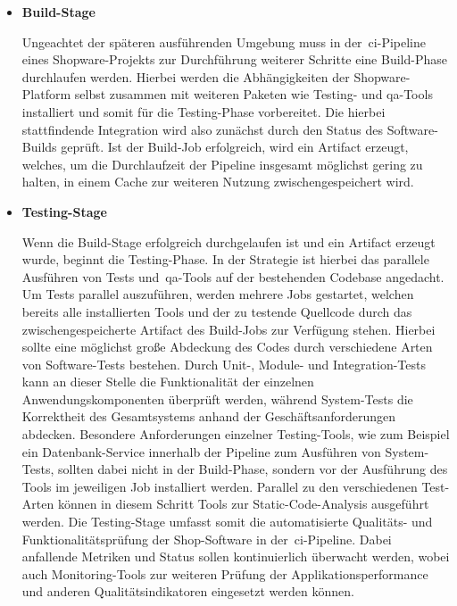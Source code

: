 \begin{itemize}
    \item {
        \textbf{Build-Stage}\par
        Ungeachtet der späteren ausführenden Umgebung muss in der\ \acrshort{ci}-Pipeline eines Shopware-Projekts zur
        Durchführung weiterer Schritte eine Build-Phase durchlaufen werden.
        Hierbei werden die Abhängigkeiten der Shopware-Platform selbst zusammen mit weiteren Paketen wie Testing- und
        \acrshort{qa}-Tools installiert und somit für die Testing-Phase vorbereitet.
        Die hierbei stattfindende Integration wird also zunächst durch den Status des Software-Builds geprüft.
        Ist der Build-Job erfolgreich, wird ein Artifact erzeugt, welches, um die Durchlaufzeit der Pipeline insgesamt
        möglichst gering zu halten, in einem Cache zur weiteren Nutzung zwischengespeichert wird.
    }

    \item {
        \textbf{Testing-Stage}\par
        Wenn die Build-Stage erfolgreich durchgelaufen ist und ein Artifact erzeugt wurde, beginnt die Testing-Phase.
        In der Strategie ist hierbei das parallele Ausführen von Tests und\ \acrshort{qa}-Tools auf der bestehenden
        Codebase angedacht.
        Um Tests parallel auszuführen, werden mehrere Jobs gestartet, welchen bereits alle installierten Tools
        und der zu testende Quellcode durch das zwischengespeicherte Artifact des Build-Jobs zur Verfügung stehen.
        Hierbei sollte eine möglichst große Abdeckung des Codes durch verschiedene Arten von Software-Tests bestehen.
        Durch Unit-, Module- und Integration-Tests kann an dieser Stelle die Funktionalität der einzelnen
        Anwendungskomponenten überprüft werden, während System-Tests die Korrektheit des Gesamtsystems anhand der
        Geschäftsanforderungen abdecken.
        Besondere Anforderungen einzelner Testing-Tools, wie zum Beispiel ein Datenbank-Service innerhalb der Pipeline
        zum Ausführen von System-Tests, sollten dabei nicht in der Build-Phase, sondern vor der Ausführung des Tools im
        jeweiligen Job installiert werden.
        Parallel zu den verschiedenen Test-Arten können in diesem Schritt Tools zur Static-Code-Analysis ausgeführt
        werden.
        Die Testing-Stage umfasst somit die automatisierte Qualitäts- und Funktionalitätsprüfung der Shop-Software in
        der\ \acrshort{ci}-Pipeline.
        Dabei anfallende Metriken und Status sollen kontinuierlich überwacht werden, wobei auch Monitoring-Tools zur
        weiteren Prüfung der Applikationsperformance und anderen Qualitätsindikatoren eingesetzt werden können.
    }


\end{itemize}
